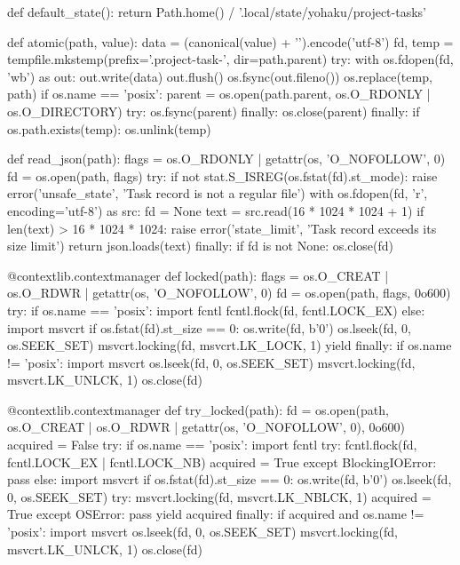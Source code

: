 def default_state():
    return Path.home() / '.local/state/yohaku/project-tasks'


def atomic(path, value):
    data = (canonical(value) + '\n').encode('utf-8')
    fd, temp = tempfile.mkstemp(prefix='.project-task-', dir=path.parent)
    try:
        with os.fdopen(fd, 'wb') as out:
            out.write(data)
            out.flush()
            os.fsync(out.fileno())
        os.replace(temp, path)
        if os.name == 'posix':
            parent = os.open(path.parent, os.O_RDONLY | os.O_DIRECTORY)
            try:
                os.fsync(parent)
            finally:
                os.close(parent)
    finally:
        if os.path.exists(temp):
            os.unlink(temp)


def read_json(path):
    flags = os.O_RDONLY | getattr(os, 'O_NOFOLLOW', 0)
    fd = os.open(path, flags)
    try:
        if not stat.S_ISREG(os.fstat(fd).st_mode):
            raise error('unsafe_state', 'Task record is not a regular file')
        with os.fdopen(fd, 'r', encoding='utf-8') as src:
            fd = None
            text = src.read(16 * 1024 * 1024 + 1)
        if len(text) > 16 * 1024 * 1024:
            raise error('state_limit', 'Task record exceeds its size limit')
        return json.loads(text)
    finally:
        if fd is not None:
            os.close(fd)


@contextlib.contextmanager
def locked(path):
    flags = os.O_CREAT | os.O_RDWR | getattr(os, 'O_NOFOLLOW', 0)
    fd = os.open(path, flags, 0o600)
    try:
        if os.name == 'posix':
            import fcntl
            fcntl.flock(fd, fcntl.LOCK_EX)
        else:
            import msvcrt
            if os.fstat(fd).st_size == 0:
                os.write(fd, b'0')
            os.lseek(fd, 0, os.SEEK_SET)
            msvcrt.locking(fd, msvcrt.LK_LOCK, 1)
        yield
    finally:
        if os.name != 'posix':
            import msvcrt
            os.lseek(fd, 0, os.SEEK_SET)
            msvcrt.locking(fd, msvcrt.LK_UNLCK, 1)
        os.close(fd)


@contextlib.contextmanager
def try_locked(path):
    fd = os.open(path, os.O_CREAT | os.O_RDWR | getattr(os, 'O_NOFOLLOW', 0), 0o600)
    acquired = False
    try:
        if os.name == 'posix':
            import fcntl
            try:
                fcntl.flock(fd, fcntl.LOCK_EX | fcntl.LOCK_NB)
                acquired = True
            except BlockingIOError:
                pass
        else:
            import msvcrt
            if os.fstat(fd).st_size == 0:
                os.write(fd, b'0')
            os.lseek(fd, 0, os.SEEK_SET)
            try:
                msvcrt.locking(fd, msvcrt.LK_NBLCK, 1)
                acquired = True
            except OSError:
                pass
        yield acquired
    finally:
        if acquired and os.name != 'posix':
            import msvcrt
            os.lseek(fd, 0, os.SEEK_SET)
            msvcrt.locking(fd, msvcrt.LK_UNLCK, 1)
        os.close(fd)


